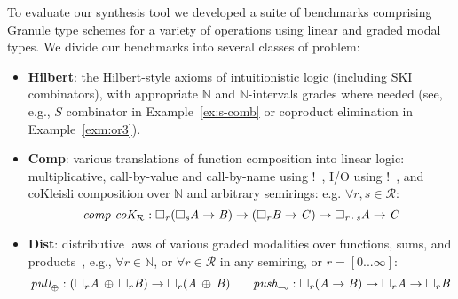 To evaluate our synthesis tool we developed a suite of benchmarks comprising
Granule type schemes for a variety of operations using linear and graded modal
types. We divide our benchmarks into several classes of problem:
%
\begin{itemize}[itemsep=0em,leftmargin=1.1em]
\item \textbf{Hilbert}: the Hilbert-style axioms of
  intuitionistic logic (including SKI combinators), with appropriate $\mathbb{N}$ and $\mathbb{N}$-intervals
  grades where needed (see, e.g., $S$ combinator in
  Example~\ref{ex:s-comb} or coproduct elimination in Example~\ref{exm:or3}).

\item \textbf{Comp}: various translations of function composition
into linear logic: multiplicative, call-by-value and
call-by-name using $!$~\cite{girard1987linear}, I/O using $!$~\cite{liang2009focusing},
and coKleisli composition over $\mathbb{N}$ and arbitrary semirings:
e.g. $\forall r, s \in \mathcal{R}$:
%
\begin{equation*}
\textit{comp-}\textit{coK}_{\mathcal{R}} : \Box_{  \GRANULEnt{r}  }  \GRANULEsym{(}    \Box_{  \GRANULEnt{s}  }  \GRANULEnt{A}    \rightarrow  \GRANULEnt{B}  \GRANULEsym{)}    \rightarrow   \GRANULEsym{(}    \Box_{  \GRANULEnt{r}  }  \GRANULEnt{B}    \rightarrow  \GRANULEnt{C}  \GRANULEsym{)}  \rightarrow     \Box_{   \GRANULEnt{r}  \textcolor{coeffectColor}{\,\cdot\,}  \GRANULEnt{s}   }  \GRANULEnt{A}    \rightarrow  \GRANULEnt{C}
\end{equation*}
%
\item \textbf{Dist}: distributive laws of various graded
modalities over functions, sums, and products~\cite{hughes2020},
e.g., $\forall r \in \mathbb{N}$, or
$\forall r \in \mathcal{R}$ in any semiring, or $r = [   0   ...   \infty   ]$:
%
\begin{equation*}
\textit{pull}_\oplus : (     \Box_{  \mathit{r}  }  \mathit{A}    \, \oplus \,    \Box_{  \mathit{r}  }  \mathit{B}     )  \rightarrow   \Box_{  \mathit{r}  }  (   \mathit{A}  \, \oplus \,  \mathit{B}   )
\quad\;\;\;
\textit{push}_\multimap : \Box_{  \mathit{r}  }  (  \mathit{A}  \rightarrow  \mathit{B}  )    \rightarrow     \Box_{  \mathit{r}  }  \mathit{A}    \rightarrow   \Box_{  \mathit{r}  }  \mathit{B}
\end{equation*}
%


\end{itemize}
